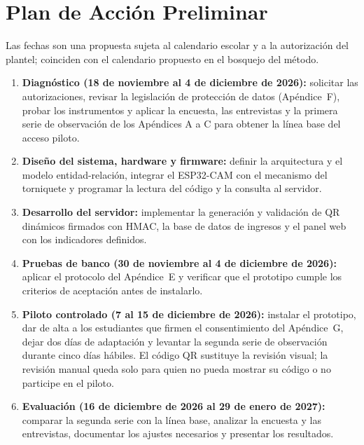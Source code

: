 \section{Plan de Acción Preliminar}
Las fechas son una propuesta sujeta al calendario escolar y a la
autorización del plantel; coinciden con el calendario propuesto en el bosquejo del
método.
\begin{enumerate}
	\item \textbf{Diagnóstico (18 de noviembre al 4 de diciembre de 2026):}
	      solicitar las autorizaciones, revisar la legislación de protección de
	      datos (Apéndice~F), probar los instrumentos y aplicar la encuesta, las
	      entrevistas y la primera serie de observación de los Apéndices A a C
	      para obtener la línea base del acceso piloto.
	\item \textbf{Diseño del sistema, hardware y firmware:} definir la
	      arquitectura y el modelo entidad-relación, integrar el ESP32-CAM con el
	      mecanismo del torniquete y programar la lectura del código y la consulta
	      al servidor.
	\item \textbf{Desarrollo del servidor:} implementar la generación y
	      validación de QR dinámicos firmados con HMAC, la base de datos de ingresos y
	      el panel web con los indicadores definidos.
	\item \textbf{Pruebas de banco (30 de noviembre al 4 de diciembre de
	      2026):} aplicar el protocolo del Apéndice~E y verificar que el prototipo
	      cumple los criterios de aceptación antes de instalarlo.
	\item \textbf{Piloto controlado (7 al 15 de diciembre de 2026):} instalar el
	      prototipo, dar de alta a los estudiantes que firmen el consentimiento del
	      Apéndice~G, dejar dos días de adaptación y levantar la segunda serie de
	      observación durante cinco días hábiles. El código QR sustituye la
	      revisión visual; la revisión manual queda solo para quien no pueda
	      mostrar su código o no participe en el piloto.
	\item \textbf{Evaluación (16 de diciembre de 2026 al 29 de enero de 2027):}
	      comparar la segunda serie con la línea base, analizar la encuesta y las
	      entrevistas, documentar los ajustes necesarios y presentar los
	      resultados.
\end{enumerate}
